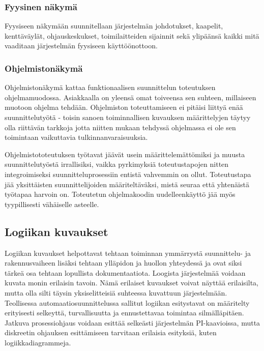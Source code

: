 \documentclass[finnish,12pt]{article}
\begin{document}
		\subsubsection{Fyysinen näkymä}

Fyysiseen näkymään suunnitellaan järjestelmän johdotukset, kaapelit, kenttäväylät,
ohjauskeskukset, toimilaitteiden sijainnit sekä ylipäänsä kaikki mitä vaaditaan 
järjestelmän fyysiseen käyttöönottoon.


		\subsubsection{Ohjelmistonäkymä}

Ohjelmistonäkymä kattaa funktionaalisen suunnittelun toteutuksen ohjelmamuodossa.
Asiakkaalla on yleensä omat toiveensa sen suhteen, millaiseen muotoon ohjelma tehdään.
Ohjelmiston toteuttamiseen ei pitäisi liittyä enää suunnittelutyötä - toisin sanoen toiminnallisen kuvauksen määrittelyjen täytyy olla riittävän tarkkoja jotta niitten mukaan tehdyssä ohjelmassa ei ole sen toimintaan vaikuttavia tulkinnanvaraisuuksia.

Ohjelmistototeutuksen työtavat jäävät usein määrittelemättömiksi ja muusta suunnittelutyöstä irrallisiksi,
vaikka pyrkimyksiä toteutustapojen nitten integroimiseksi suunnitteluprosessiin entistä vahvemmin on ollut.
Toteutustapa jää yksittäisten suunnittelijoiden määriteltäväksi, mistä seuraa että yhtenäistä työtapaa harvoin on.
Toteutetun ohjelmakoodin uudelleenkäyttö jää myös tyypillisesti vähäiselle asteelle. \cite{RefWorks:42}


	\subsection{Logiikan kuvaukset}


Logiikan kuvaukset helpottavat tehtaan toiminnan ymmärrystä suunnittelu- ja rakennusvaiheen lisäksi tehtaan ylläpidon ja huollon yhteydessä ja ovat siksi tärkeä osa tehtaan lopullista dokumentaatiota.
Loogista järjestelmää voidaan kuvata monin erilaisin tavoin.
Nämä erilaiset kuvaukset voivat näyttää erilaisilta, mutta olla silti täysin yksiselitteisiä suhteessa kuvattuun järjestelmään.
Teollisessa automaatiosuunnittelussa sallitut logiikan esitystavat on määritelty erityisesti selkeyttä, turvallisuutta ja ennustettavaa toimintaa silmälläpitäen.
Jatkuva prosessiohjaus voidaan esittää selkeästi järjestelmän PI-kaavioissa, mutta diskreetin ohjauksen esittämiseen tarvitaan erilaisia esityksiä, kuten logiikkadiagrammeja. \cite{RefWorks:54}
\end{document}
